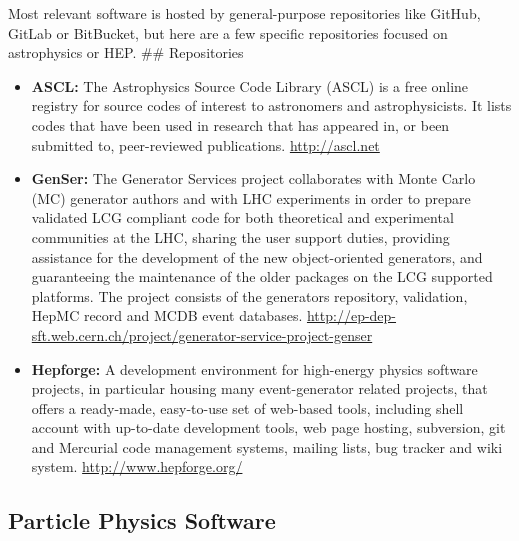 Most relevant software is hosted by general-purpose repositories like
GitHub, GitLab or BitBucket, but here are a few specific repositories
focused on astrophysics or HEP. \#\# Repositories

\begin{itemize}
\item
  \textbf{ASCL:} The Astrophysics Source Code Library (ASCL) is a free
  online registry for source codes of interest to astronomers and
  astrophysicists. It lists codes that have been used in research that
  has appeared in, or been submitted to, peer-reviewed publications.
  \url{http://ascl.net}
\item
  \textbf{GenSer:} The Generator Services project collaborates with
  Monte Carlo (MC) generator authors and with LHC experiments in order
  to prepare validated LCG compliant code for both theoretical and
  experimental communities at the LHC, sharing the user support duties,
  providing assistance for the development of the new object-oriented
  generators, and guaranteeing the maintenance of the older packages on
  the LCG supported platforms. The project consists of the generators
  repository, validation, HepMC record and MCDB event databases.
  \url{http://ep-dep-sft.web.cern.ch/project/generator-service-project-genser}
\item
  \textbf{Hepforge:} A development environment for high-energy physics
  software projects, in particular housing many event-generator related
  projects, that offers a ready-made, easy-to-use set of web-based
  tools, including shell account with up-to-date development tools, web
  page hosting, subversion, git and Mercurial code management systems,
  mailing lists, bug tracker and wiki system.
  \url{http://www.hepforge.org/}
\end{itemize}

\subsection{Particle Physics Software}\label{databases:subsec:software}

